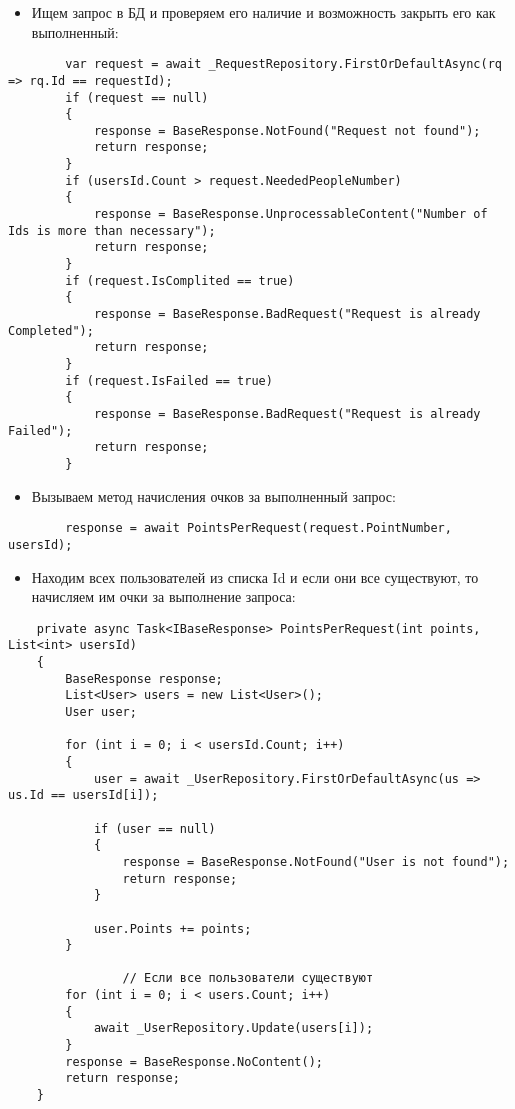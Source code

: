 \begin{itemize}
	\item{Ищем запрос в БД и проверяем его наличие и возможность закрыть его как выполненный:}
\end{itemize}
\begin{verbatim}
        var request = await _RequestRepository.FirstOrDefaultAsync(rq => rq.Id == requestId);
        if (request == null)
        {
            response = BaseResponse.NotFound("Request not found");
            return response;
        }
        if (usersId.Count > request.NeededPeopleNumber)
        {
            response = BaseResponse.UnprocessableContent("Number of Ids is more than necessary");
            return response;
        }
        if (request.IsComplited == true)
        {
            response = BaseResponse.BadRequest("Request is already Completed");
            return response;
        }
        if (request.IsFailed == true)
        {
            response = BaseResponse.BadRequest("Request is already Failed");
            return response;
        }
\end{verbatim}
\begin{itemize}
	\item{Вызываем метод начисления очков за выполненный запрос:}
\end{itemize}
\begin{verbatim}
        response = await PointsPerRequest(request.PointNumber, usersId);
\end{verbatim}

\begin{itemize}
	\item{Находим всех пользователей из списка Id и если они все существуют, то начисляем им очки за выполнение запроса:}
\end{itemize}
\begin{verbatim}
    private async Task<IBaseResponse> PointsPerRequest(int points, List<int> usersId)
    {
        BaseResponse response;
        List<User> users = new List<User>();
        User user;

        for (int i = 0; i < usersId.Count; i++)
        {
            user = await _UserRepository.FirstOrDefaultAsync(us => us.Id == usersId[i]);

            if (user == null)
            {
                response = BaseResponse.NotFound("User is not found");
                return response;
            }

            user.Points += points;
        }

				// Если все пользователи существуют
        for (int i = 0; i < users.Count; i++)
        {
            await _UserRepository.Update(users[i]);
        }
        response = BaseResponse.NoContent();
        return response;
    }
\end{verbatim}

